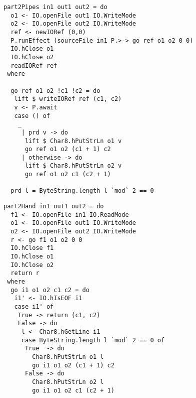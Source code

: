 \begin{lstlisting}[float=ht,label=l:a:bench:part2Pipes,caption=Pipes implementation of \Hs/part2/]
part2Pipes in1 out1 out2 = do
  o1 <- IO.openFile out1 IO.WriteMode
  o2 <- IO.openFile out2 IO.WriteMode
  ref <- newIORef (0,0)
  P.runEffect (sourceFile in1 P.>-> go ref o1 o2 0 0)
  IO.hClose o1
  IO.hClose o2
  readIORef ref
 where

  go ref o1 o2 !c1 !c2 = do
   lift $ writeIORef ref (c1, c2)
   v <- P.await
   case () of
    _
     | prd v -> do
      lift $ Char8.hPutStrLn o1 v
      go ref o1 o2 (c1 + 1) c2
     | otherwise -> do
      lift $ Char8.hPutStrLn o2 v
      go ref o1 o2 c1 (c2 + 1)

  prd l = ByteString.length l `mod` 2 == 0
\end{lstlisting}

\begin{lstlisting}[float=ht,label=l:a:bench:part2Hand,caption=Hand implementation of \Hs/part2/]
part2Hand in1 out1 out2 = do
  f1 <- IO.openFile in1 IO.ReadMode
  o1 <- IO.openFile out1 IO.WriteMode
  o2 <- IO.openFile out2 IO.WriteMode
  r <- go f1 o1 o2 0 0
  IO.hClose f1
  IO.hClose o1
  IO.hClose o2
  return r
 where
  go i1 o1 o2 c1 c2 = do
   i1' <- IO.hIsEOF i1
   case i1' of
    True -> return (c1, c2)
    False -> do
     l <- Char8.hGetLine i1
     case ByteString.length l `mod` 2 == 0 of
      True  -> do
        Char8.hPutStrLn o1 l
        go i1 o1 o2 (c1 + 1) c2
      False -> do
        Char8.hPutStrLn o2 l
        go i1 o1 o2 c1 (c2 + 1)
\end{lstlisting}

